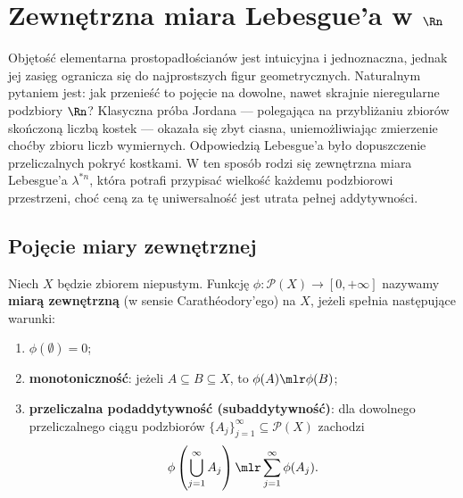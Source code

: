 \section{Zewnętrzna miara Lebesgue'a w $\Rn$}

Objętość elementarna prostopadłościanów jest intuicyjna i jednoznaczna, jednak jej zasięg ogranicza się do najprostszych figur geometrycznych. Naturalnym pytaniem jest: jak przenieść to pojęcie na dowolne, nawet skrajnie nieregularne podzbiory $\Rn$? Klasyczna próba Jordana — polegająca na przybliżaniu zbiorów skończoną liczbą kostek — okazała się zbyt ciasna, uniemożliwiając zmierzenie choćby zbioru liczb wymiernych. Odpowiedzią Lebesgue’a było dopuszczenie przeliczalnych pokryć kostkami. W ten sposób rodzi się zewnętrzna miara Lebesgue’a $\lambda^{*n}$, która potrafi przypisać wielkość każdemu podzbiorowi przestrzeni, choć ceną za tę uniwersalność jest utrata pełnej addytywności.

\subsection{Pojęcie miary zewnętrznej}

\begin{defi}
    Niech $X$ będzie zbiorem niepustym. Funkcję $\phi \colon \mathcal{P}(X) \to [0, +\infty]$ nazywamy \textbf{miarą zewnętrzną} (w sensie Carathéodory'ego) na $X$, jeżeli spełnia następujące warunki:
    \begin{enumerate}
        \item[(i)] $\phi(\emptyset) = 0$;
        \item[(ii)] \textbf{monotoniczność}: jeżeli $A \subseteq  B \subseteq  X$, to $\phi(A) \mlr \phi(B)$;
        \item[(iii)] \textbf{przeliczalna podaddytywność (subaddytywność)}: dla dowolnego przeliczalnego ciągu podzbiorów $\{A_j\}_{j=1}^\infty \subseteq \mathcal{P}(X)$ zachodzi
              \begin{equation*}
                  \phi\left(\bigcup_{j=1}^\infty A_j\right) \mlr \sum_{j=1}^\infty \phi(A_j).
              \end{equation*}
    \end{enumerate}
\end{defi}

